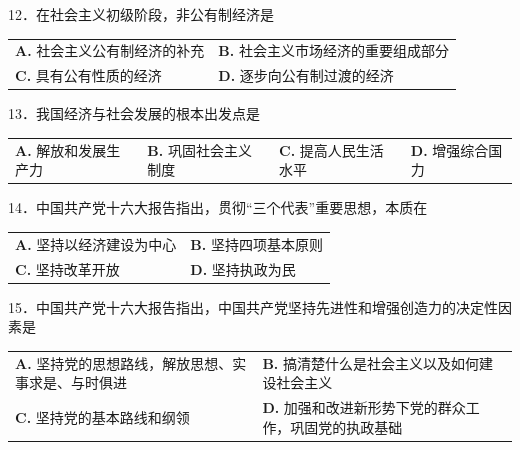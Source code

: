 \documentclass[UTF8,11pt]{ctexart}
\begin{document}
12．在社会主义初级阶段，非公有制经济是


\begin{center}\begin{tabular}{>{\raggedright\arraybackslash}p{\dimexpr(\linewidth-4\tabcolsep)/2\relax}>{\raggedright\arraybackslash}p{\dimexpr(\linewidth-4\tabcolsep)/2\relax}}
\textbf{A.} 社会主义公有制经济的补充 & \textbf{B.} 社会主义市场经济的重要组成部分\\[.35em]
\textbf{C.} 具有公有性质的经济 & \textbf{D.} 逐步向公有制过渡的经济\\[.35em]\end{tabular}\end{center}

13．我国经济与社会发展的根本出发点是


\begin{center}\begin{tabular}{>{\raggedright\arraybackslash}p{\dimexpr(\linewidth-8\tabcolsep)/4\relax}>{\raggedright\arraybackslash}p{\dimexpr(\linewidth-8\tabcolsep)/4\relax}>{\raggedright\arraybackslash}p{\dimexpr(\linewidth-8\tabcolsep)/4\relax}>{\raggedright\arraybackslash}p{\dimexpr(\linewidth-8\tabcolsep)/4\relax}}
\textbf{A.} 解放和发展生产力 & \textbf{B.} 巩固社会主义制度 & \textbf{C.} 提高人民生活水平 & \textbf{D.} 增强综合国力\\[.35em]\end{tabular}\end{center}

14．中国共产党十六大报告指出，贯彻“三个代表”重要思想，本质在


\begin{center}\begin{tabular}{>{\raggedright\arraybackslash}p{\dimexpr(\linewidth-4\tabcolsep)/2\relax}>{\raggedright\arraybackslash}p{\dimexpr(\linewidth-4\tabcolsep)/2\relax}}
\textbf{A.} 坚持以经济建设为中心 & \textbf{B.} 坚持四项基本原则\\[.35em]
\textbf{C.} 坚持改革开放 & \textbf{D.} 坚持执政为民\\[.35em]\end{tabular}\end{center}

15．中国共产党十六大报告指出，中国共产党坚持先进性和增强创造力的决定性因素是


\begin{center}\begin{tabular}{>{\raggedright\arraybackslash}p{\dimexpr(\linewidth-4\tabcolsep)/2\relax}>{\raggedright\arraybackslash}p{\dimexpr(\linewidth-4\tabcolsep)/2\relax}}
\textbf{A.} 坚持党的思想路线，解放思想、实事求是、与时俱进 & \textbf{B.} 搞清楚什么是社会主义以及如何建设社会主义\\[.35em]
\textbf{C.} 坚持党的基本路线和纲领 & \textbf{D.} 加强和改进新形势下党的群众工作，巩固党的执政基础\\[.35em]\end{tabular}\end{center}
\end{document}
